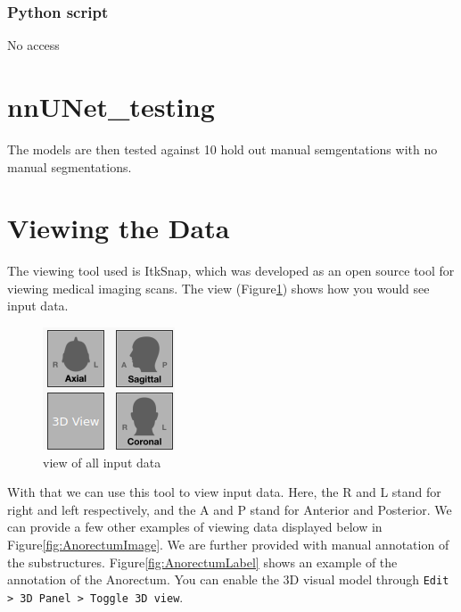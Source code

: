 \documentclass[11pt]{article}
\begin{document}
\subsubsection*{Python script}

No access

\section{nnUNet\_testing}

The models are then tested against 10 hold out manual semgentations with no manual segmentations.

\section{Viewing the Data}\label{section:itksnap}

The viewing tool used is ItkSnap, which was developed as an open source tool for viewing medical imaging scans. The view (Figure\ref{fig:view}) shows how you would see input data.

\begin{figure}[H]
    \centering
    \includegraphics[]{images/view.png}
    \caption{view of all input data}\label{fig:view}
\end{figure}

With that we can use this tool to view input data. Here, the R and L stand for right and left respectively, and the A and P stand for Anterior and Posterior. We can provide a few other examples of viewing data displayed below in Figure\ref{fig:AnorectumImage}. We are further provided with manual annotation of the substructures. Figure\ref{fig:AnorectumLabel} shows an example of the annotation of the Anorectum. You can enable the 3D visual model through \texttt{Edit > 3D Panel > Toggle 3D view}.
\end{document}

